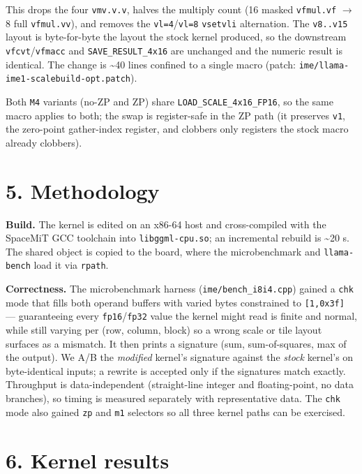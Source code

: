 \documentclass[
]{article}
\begin{document}
This drops the four \texttt{vmv.v.v}, halves the multiply count (16
masked \texttt{vfmul.vf} \(\to\) 8 full \texttt{vfmul.vv}), and removes
the \texttt{vl=4}/\texttt{vl=8} \texttt{vsetvli} alternation. The
\texttt{v8..v15} layout is byte-for-byte the layout the stock kernel
produced, so the downstream \texttt{vfcvt}/\texttt{vfmacc} and
\texttt{SAVE\_RESULT\_4x16} are unchanged and the numeric result is
identical. The change is \textasciitilde40 lines confined to a single
macro (patch: \texttt{ime/llama-ime1-scalebuild-opt.patch}).

Both \texttt{M4} variants (no-ZP and ZP) share
\texttt{LOAD\_SCALE\_4x16\_FP16}, so the same macro applies to both; the
swap is register-safe in the ZP path (it preserves \texttt{v1}, the
zero-point gather-index register, and clobbers only registers the stock
macro already clobbers).

\section{5. Methodology}\label{methodology}

\textbf{Build.} The kernel is edited on an x86-64 host and
cross-compiled with the SpaceMiT GCC toolchain into
\texttt{libggml-cpu.so}; an incremental rebuild is \textasciitilde20 s.
The shared object is copied to the board, where the microbenchmark and
\texttt{llama-bench} load it via \texttt{rpath}.

\textbf{Correctness.} The microbenchmark harness
(\texttt{ime/bench\_i8i4.cpp}) gained a \texttt{chk} mode that fills
both operand buffers with varied bytes constrained to
\texttt{{[}1,0x3f{]}} --- guaranteeing every \texttt{fp16}/\texttt{fp32}
value the kernel might read is finite and normal, while still varying
per (row, column, block) so a wrong scale or tile layout surfaces as a
mismatch. It then prints a signature (sum, sum-of-squares, max of the
output). We A/B the \emph{modified} kernel's signature against the
\emph{stock} kernel's on byte-identical inputs; a rewrite is accepted
only if the signatures match exactly. Throughput is data-independent
(straight-line integer and floating-point, no data branches), so timing
is measured separately with representative data. The \texttt{chk} mode
also gained \texttt{zp} and \texttt{m1} selectors so all three kernel
paths can be exercised.

\section{6. Kernel results}\label{kernel-results}
\end{document}
